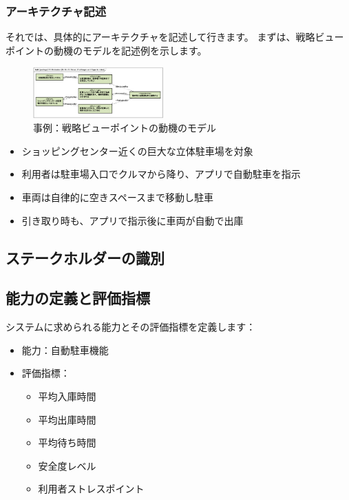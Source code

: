 \subsubsection{アーキテクチャ記述}
それでは、具体的にアーキテクチャを記述して行きます。
まずは、戦略ビューポイントの動機のモデルを記述例を示します。
\begin{figure}
    \begin{center}
    \includegraphics[width=50mm]{safety_assurance_contents/ch4images/fig9.png}
    \caption{事例：戦略ビューポイントの動機のモデル}
    \label{figure:ch4-7}
    \end{center}
\end{figure}
\begin{itemize}
\item ショッピングセンター近くの巨大な立体駐車場を対象
\item 利用者は駐車場入口でクルマから降り、アプリで自動駐車を指示
\item 車両は自律的に空きスペースまで移動し駐車
\item 引き取り時も、アプリで指示後に車両が自動で出庫
\end{itemize}
\subsection{ステークホルダーの識別}


\subsection{能力の定義と評価指標}

システムに求められる能力とその評価指標を定義します：

\begin{itemize}
    \item 能力：自動駐車機能
    \item 評価指標：
    \begin{itemize}
        \item 平均入庫時間
        \item 平均出庫時間
        \item 平均待ち時間
        \item 安全度レベル
        \item 利用者ストレスポイント
    \end{itemize}
\end{itemize}

